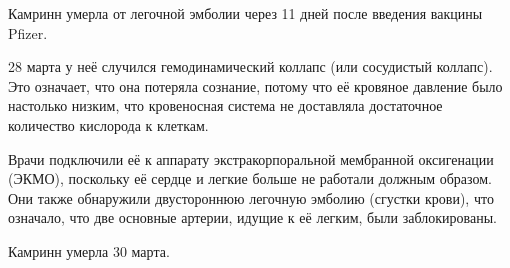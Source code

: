 Камринн умерла от легочной эмболии через 11 дней после введения вакцины Pfizer.

28 марта у неё случился гемодинамический коллапс (или сосудистый коллапс). Это
означает, что она потеряла сознание, потому что её кровяное давление было
настолько низким, что кровеносная система не доставляла достаточное количество
кислорода к клеткам.

Врачи подключили её к аппарату экстракорпоральной мембранной оксигенации (ЭКМО),
поскольку её сердце и легкие больше не работали должным образом. Они также
обнаружили двустороннюю легочную эмболию (сгустки крови), что означало, что две
основные артерии, идущие к её легким, были заблокированы.

Камринн умерла 30 марта.
